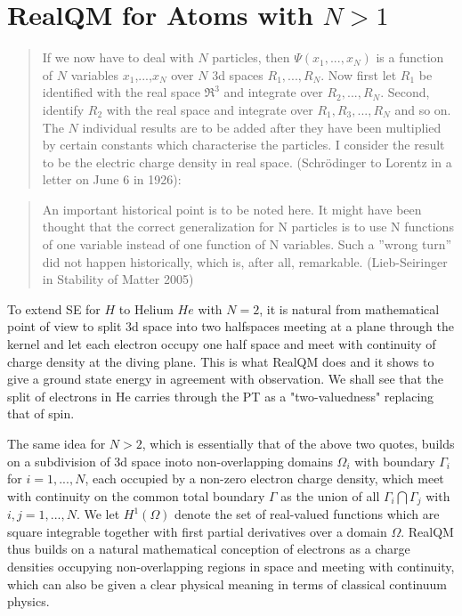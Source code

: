 \documentclass[11pt]{article} %
\begin{document}
\section{RealQM for Atoms with $N>1$}
\begin{quote}
If we now have to deal with $N$ particles, then $\Psi (x_1,...,x_N )$ is a function of $N$ variables $x_1$,...,$x_N$  over $N$ 3d spaces $R_1,...,R_N$.  Now first let $R_1$ be identified with the real space $\Re^3$ and integrate over $R_2,...,R_N$. Second, identify $R_2$ with the real space and integrate over $R_1, R_3,...,R_N$ and so on. 
The $N$ individual results are to be added after they have been multiplied by certain constants which characterise the particles.  I consider the result to be the electric charge density in real space.  (Schr\"odinger to Lorentz in a letter on June 6 in 1926):
\end{quote}
\begin{quote} An important historical point is to be noted here. It might have been thought that the correct generalization for N particles is to use N functions of one variable instead of one function of N variables. 
Such a ”wrong turn” did not happen historically,  which is,  after all,  remarkable. (Lieb-Seiringer in Stability of Matter 2005)
\end{quote}



To extend SE for $H$ to Helium $He$ with $N=2$,  it is natural from mathematical point of view to split 3d space into two halfspaces meeting at a plane through the kernel and let each electron occupy one half space and meet with continuity of charge density at the diving plane.  This is what RealQM does and it shows to give a ground state energy in agreement with observation.  We shall see that the split of electrons in He carries through the PT as a "two-valuedness" replacing that of spin.

The same idea for $N>2$,  which is essentially that of the above two quotes,  builds on a subdivision of 3d space inoto non-overlapping domains $\Omega_i$ with boundary $\Gamma_i$ for $i=1,...,N$,  each occupied by a non-zero electron charge density,  which meet with continuity on the common total boundary $\Gamma $ as the union of all $\Gamma_i\bigcap\Gamma_j$ with $i,j=1,...,N$.  We let $H^1(\Omega )$ denote the set of real-valued functions which are square integrable together with first partial derivatives over a domain $\Omega$.  RealQM thus builds on a natural mathematical conception of electrons as a charge densities occupying non-overlapping regions in space and meeting with continuity,  which can also be given a clear physical meaning in terms of classical continuum physics.  
\end{document}
